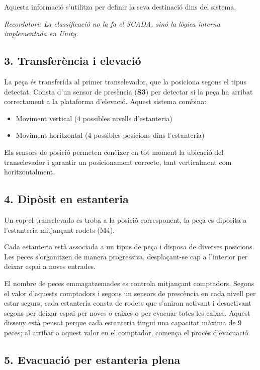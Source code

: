 \documentclass[12pt,a4paper]{report}
\begin{document}
Aquesta informació s'utilitza per definir la seva destinació dins del sistema.


\textit{Recordatori: La classificació no la fa el SCADA, sinó la lògica interna implementada en Unity.}

\subsection*{3. Transferència i elevació}

La peça és transferida al primer transelevador, que la posiciona segons el tipus detectat. Consta d'un sensor de presència (\textbf{S3}) per detectar si la peça ha arribat correctament a la plataforma d'elevació. Aquest sistema combina:
\begin{itemize}
\item Moviment vertical (4 possibles nivells d'estanteria) 
\item Moviment horitzontal (4 possibles posicions dins l'estanteria) 
\end{itemize}

Els sensors de posició permeten conèixer en tot moment la ubicació del transelevador i garantir un posicionament correcte, tant verticalment com horitzontalment.

\subsection*{4. Dipòsit en estanteria}

Un cop el transelevado es troba a la posició corresponent, la peça es diposita a l'estanteria mitjançant rodets (M4). 

Cada estanteria està associada a un tipus de peça i disposa de diverses posicions. Les peces s'organitzen de manera progressiva, desplaçant-se cap a l'interior per deixar espai a noves entrades.

El nombre de peces emmagatzemades es controla mitjançant comptadors. Segons el valor d'aquests comptadors i segons un sensors de prescència en cada nivell per estar segurs, cada estantería consta de rodets que s'aniran activant i desactivant segons per deixar espai per noves o caixes o per evacuar totes les caixes. Aquest disseny està pensat perque cada estanteria tingui una capacitat màxima de 9 peces; al arribar a aquest valor en el comptador, comença el procès d'evacuació.

\subsection*{5. Evacuació per estanteria plena}
\end{document}
